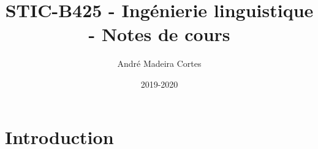 \documentclass{article}
\title{STIC-B425 - Ingénierie linguistique - Notes de cours}
\author{André Madeira Cortes}
\date{2019-2020}
\begin{document}
\maketitle

\section{Introduction}
\end{document}
